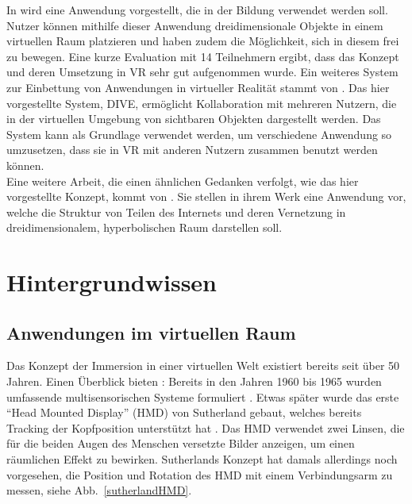 \documentclass[12pt, a4paper]{article}
\begin{document}
In  wird eine Anwendung vorgestellt, die in der Bildung verwendet werden soll. Nutzer können mithilfe dieser Anwendung dreidimensionale Objekte in einem virtuellen Raum platzieren und haben zudem die Möglichkeit, sich in diesem frei zu bewegen. Eine kurze Evaluation mit 14 Teilnehmern ergibt, dass das Konzept und deren Umsetzung in VR sehr gut aufgenommen wurde. Ein weiteres System zur Einbettung von Anwendungen in virtueller Realität stammt von . Das hier vorgestellte System, DIVE, ermöglicht Kollaboration mit mehreren Nutzern, die in der virtuellen Umgebung von sichtbaren Objekten dargestellt werden. Das System kann als Grundlage verwendet werden, um verschiedene Anwendung so umzusetzen, dass sie in VR mit anderen Nutzern zusammen benutzt werden können.\\

Eine weitere Arbeit, die einen ähnlichen Gedanken verfolgt, wie das hier vorgestellte Konzept, kommt von . Sie stellen in ihrem Werk eine Anwendung vor, welche die Struktur von Teilen des Internets und deren Vernetzung in dreidimensionalem, hyperbolischen Raum darstellen soll.\\

\section{Hintergrundwissen}

\subsection{Anwendungen im virtuellen Raum}

Das Konzept der Immersion in einer virtuellen Welt existiert bereits seit über 50 Jahren. Einen Überblick bieten \citeauthor{mazuryk1996virtual}: Bereits in den Jahren 1960 bis 1965 wurden umfassende multisensorischen Systeme formuliert \cite[S.~2]{mazuryk1996virtual}. Etwas später wurde das erste "`Head Mounted Display"' (HMD) von Sutherland gebaut, welches bereits Tracking der Kopfposition unterstützt hat \cite{sutherland1968head}. Das HMD verwendet zwei Linsen, die für die beiden Augen des Menschen versetzte Bilder anzeigen, um einen räumlichen Effekt zu bewirken. Sutherlands Konzept hat damals allerdings noch vorgesehen, die Position und Rotation des HMD mit einem Verbindungsarm zu messen, siehe Abb.~\ref{sutherlandHMD}.\\
\end{document}
